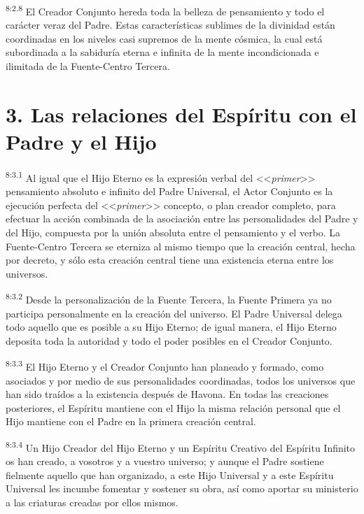 \par
\textsuperscript{8:2.8} El Creador Conjunto hereda toda la belleza de pensamiento y todo el carácter veraz del Padre. Estas características sublimes de la divinidad están coordinadas en los niveles casi supremos de la mente cósmica, la cual está subordinada a la sabiduría eterna e infinita de la mente incondicionada e ilimitada de la Fuente-Centro Tercera.

\section*{3. Las relaciones del Espíritu con el Padre y el Hijo}
\par
\textsuperscript{8:3.1} Al igual que el Hijo Eterno es la expresión verbal del <<\textit{primer}>> pensamiento absoluto e infinito del Padre Universal, el Actor Conjunto es la ejecución perfecta del <<\textit{primer}>> concepto, o plan creador completo, para efectuar la acción combinada de la asociación entre las personalidades del Padre y del Hijo, compuesta por la unión absoluta entre el pensamiento y el verbo. La Fuente-Centro Tercera se eterniza al mismo tiempo que la creación central, hecha por decreto, y sólo esta creación central tiene una existencia eterna entre los universos.

\par
\textsuperscript{8:3.2} Desde la personalización de la Fuente Tercera, la Fuente Primera ya no participa personalmente en la creación del universo. El Padre Universal delega todo aquello que es posible a su Hijo Eterno; de igual manera, el Hijo Eterno deposita toda la autoridad y todo el poder posibles en el Creador Conjunto.

\par
\textsuperscript{8:3.3} El Hijo Eterno y el Creador Conjunto han planeado y formado, como asociados y por medio de sus personalidades coordinadas, todos los universos que han sido traídos a la existencia después de Havona. En todas las creaciones posteriores, el Espíritu mantiene con el Hijo la misma relación personal que el Hijo mantiene con el Padre en la primera creación central.

\par
\textsuperscript{8:3.4} Un Hijo Creador del Hijo Eterno y un Espíritu Creativo del Espíritu Infinito os han creado, a vosotros y a vuestro universo; y aunque el Padre sostiene fielmente aquello que han organizado, a este Hijo Universal y a este Espíritu Universal les incumbe fomentar y sostener su obra, así como aportar su ministerio a las criaturas creadas por ellos mismos.

